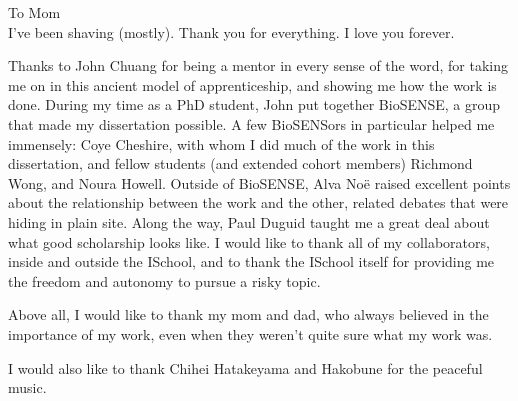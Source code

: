\begin{frontmatter}

\begin{dedication}
\null\vfil
\begin{center}


To Mom\\\vspace{12pt} I've been shaving (mostly). Thank you for everything. I
love you forever.
\end{center}
\vfil\null
\end{dedication}


\tableofcontents
\clearpage
\listoffigures
\clearpage
\listoftables

\begin{acknowledgements}
Thanks to John Chuang for being a mentor in every sense of the word, for taking
me on in this ancient model of apprenticeship, and showing me how the work is
done. During my time as a PhD student, John put together BioSENSE, a group that
made my dissertation possible. A few BioSENSors in particular helped me
immensely: Coye Cheshire, with whom I did much of the work in this dissertation,
and fellow students (and extended cohort members) Richmond Wong, and Noura
Howell. Outside of BioSENSE, Alva Noë raised excellent points about the
relationship between the work and the other, related debates that were hiding in
plain site. Along the way, Paul Duguid taught me a great deal about what good
scholarship looks like.
I would like to thank all of my collaborators, inside and outside the ISchool, and to thank the ISchool itself for providing me the freedom and autonomy to pursue a risky topic.

Above all, I would like to thank my mom and dad, who always believed in the
importance of my work, even when they weren't quite sure what my work was.

I would also like to thank Chihei Hatakeyama and Hakobune for the peaceful music.
\end{acknowledgements}


\end{frontmatter}
